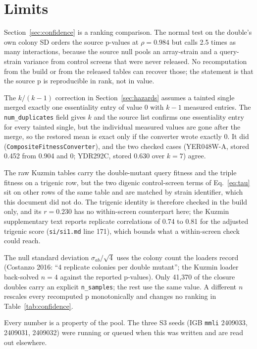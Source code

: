 
\section{Limits}

Section~\ref{sec:confidence} is a ranking comparison. The normal test on the double's
own colony SD orders the source p-values at $\rho = 0.984$ but calls 2.5 times as many
interactions, because the source null pools an array-strain and a query-strain
variance from control screens that were never released. No recomputation from the
build or from the released tables can recover those; the statement is that the
source p is reproducible in rank, not in value.

The $k/(k-1)$ correction in Section~\ref{sec:hazards} assumes a tainted single merged
exactly one essentiality entry of value 0 with $k-1$ measured entries. The
\texttt{num\_duplicates} field gives $k$ and the source list confirms one essentiality
entry for every tainted single, but the individual measured values are gone after the
merge, so the restored mean is exact only if the converter wrote exactly 0. It did
(\texttt{CompositeFitnessConverter}), and the two checked cases (YER048W-A, stored
0.452 from 0.904 and 0; YDR292C, stored 0.630 over $k = 7$) agree.

The raw Kuzmin tables carry the double-mutant query fitness and the triple fitness on
a trigenic row, but the two digenic control-screen terms of Eq.~\ref{eq:tau} sit on
other rows of the same table and are matched by strain identifier, which this
document did not do. The trigenic identity is therefore checked in the build only,
and its $r = 0.230$ has no within-screen counterpart here; the Kuzmin supplementary
text reports replicate correlations of 0.74 to 0.81 for the adjusted trigenic score
(\texttt{si/si1.md} line 171), which bounds what a within-screen check could reach.

The null standard deviation $\sigma_{ab}/\sqrt{4}$ uses the colony count the loaders
record (Costanzo 2016: ``4 replicate colonies per double mutant''; the Kuzmin loader
back-solved $n = 4$ against the reported p-values). Only 41{,}370 of the closure
doubles carry an explicit \texttt{n\_samples}; the rest use the same value. A
different $n$ rescales every recomputed p monotonically and changes no ranking in
Table~\ref{tab:confidence}.

Every number is a property of the pool. The three S3 seeds
(IGB \texttt{mmli} 2409033, 2409031, 2409032) were running or queued when this was
written and are read out elsewhere.
